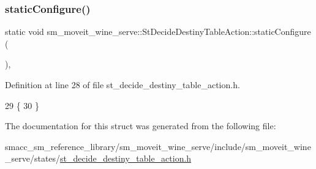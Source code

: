 \subsubsection{\texorpdfstring{static\+Configure()}{staticConfigure()}}
{\footnotesize\ttfamily static void sm\+\_\+moveit\+\_\+wine\+\_\+serve\+::\+St\+Decide\+Destiny\+Table\+Action\+::static\+Configure (\begin{DoxyParamCaption}{ }\end{DoxyParamCaption})\hspace{0.3cm}{\ttfamily [inline]}, {\ttfamily [static]}}



Definition at line 28 of file st\+\_\+decide\+\_\+destiny\+\_\+table\+\_\+action.\+h.


\begin{DoxyCode}
29         \{
30         \}
\end{DoxyCode}


The documentation for this struct was generated from the following file\+:\begin{DoxyCompactItemize}
\item 
smacc\+\_\+sm\+\_\+reference\+\_\+library/sm\+\_\+moveit\+\_\+wine\+\_\+serve/include/sm\+\_\+moveit\+\_\+wine\+\_\+serve/states/\hyperlink{st__decide__destiny__table__action_8h}{st\+\_\+decide\+\_\+destiny\+\_\+table\+\_\+action.\+h}\end{DoxyCompactItemize}
